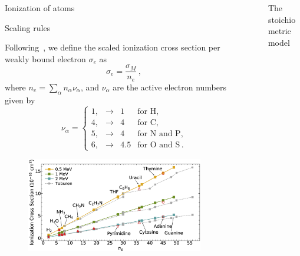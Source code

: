 \documentclass[final]{beamer}
\begin{document}
\begin{frame}[t]
\begin{columns}[t]
\begin{column}{.46\textwidth}
\begin{block}{Ionization of atoms}
\end{block}
\begin{block}{Scaling rules}
\justify

Following~\cite{toburen1975}, we define the scaled ionization cross 
section per weakly bound electron $\sigma_{e}$ as
\begin{equation}
\sigma_e=\frac{\sigma_M}{n_e}\,, 
\end{equation}
where $n_e=\sum_{\alpha}n_{\alpha}\nu_{\alpha}$, and $\nu_{\alpha}$ 
are the active electron numbers given by
\begin{equation}
\nu_{\alpha}=\left\{ 
\begin{array}{lcll}
1, & \rightarrow & 1 & \text{for H,} \\
4, & \rightarrow &  4 & \text{for C,} \\ 
5, & \rightarrow &  4 & \text{for N and P,} \\ 
6, & \rightarrow &  4.5 & \text{for O and S}\,.
\end{array}\right.
\label{eq:nelec} 
\end{equation} 

\vspace{-1cm}
\begin{figure}
\centering
\includegraphics[width=0.9\textwidth]{figures/scale_ne.eps}
\end{figure}

\end{block}
\end{column} %
\begin{column}{.02\textwidth}
\end{column} %
\begin{column}{.44\textwidth} %
\begin{block}{The stoichiometric model}
\justify


\end{block}
\end{column}
\end{columns}
\end{frame}
\end{document}
